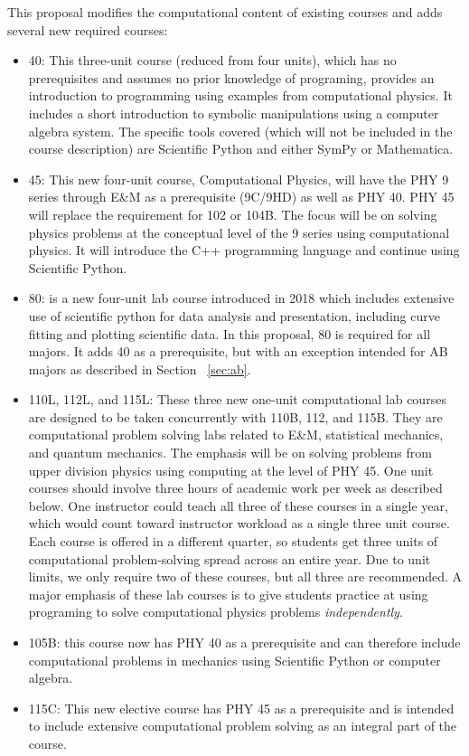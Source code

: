 \documentclass[12pt]{article}
\begin{document}
This proposal modifies the computational content of existing courses
and adds several new required courses:
\begin{itemize}
\item 40: This three-unit course (reduced from four units), which has
  no prerequisites and assumes no prior knowledge of programing,
  provides an introduction to programming using examples from
  computational physics.  It includes a short introduction to symbolic
  manipulations using a computer algebra system.  The specific tools
  covered (which will not be included in the course description) are
  Scientific Python and either SymPy or Mathematica.

\item 45: This new four-unit course, Computational Physics, will have
  the PHY 9 series through E\&M as a prerequisite (9C/9HD) as well as
  PHY 40.  PHY 45 will replace the requirement for 102 or 104B.  The
  focus will be on solving physics problems at the conceptual level of
  the 9 series using computational physics.  It will introduce the C++
  programming language and continue using Scientific Python.
  
\item 80: is a new four-unit lab course introduced in 2018 which
  includes extensive use of scientific python for data analysis and
  presentation, including curve fitting and plotting scientific data.
  In this proposal, 80 is required for all majors.  It adds 40 as a
  prerequisite, but with an exception intended for AB majors as described
  in Section ~\ref{sec:ab}.

\item 110L, 112L, and 115L: These three new one-unit computational lab
  courses are designed to be taken concurrently with 110B, 112, and
  115B. They are computational problem solving labs related to E\&M,
  statistical mechanics, and quantum mechanics.  The emphasis will be
  on solving problems from upper division physics using computing at
  the level of PHY 45.  One unit courses should involve three hours of
  academic work per week as described below.  One instructor could
  teach all three of these courses in a single year, which would count
  toward instructor workload as a single three unit course.  Each
  course is offered in a different quarter, so students get three
  units of computational problem-solving spread across an entire year.
  Due to unit limits, we only require two of these courses, but all
  three are recommended.  A major emphasis of these lab courses is to
  give students practice at using programing to solve computational
  physics problems {\em independently}.
  
\item 105B: this course now has PHY 40 as a prerequisite and can
  therefore include computational problems in mechanics using
  Scientific Python or computer algebra.

\item 115C: This new elective course has PHY 45 as a prerequisite and
  is intended to include extensive computational problem solving as an
  integral part of the course.
  
\end{itemize}
\end{document}
